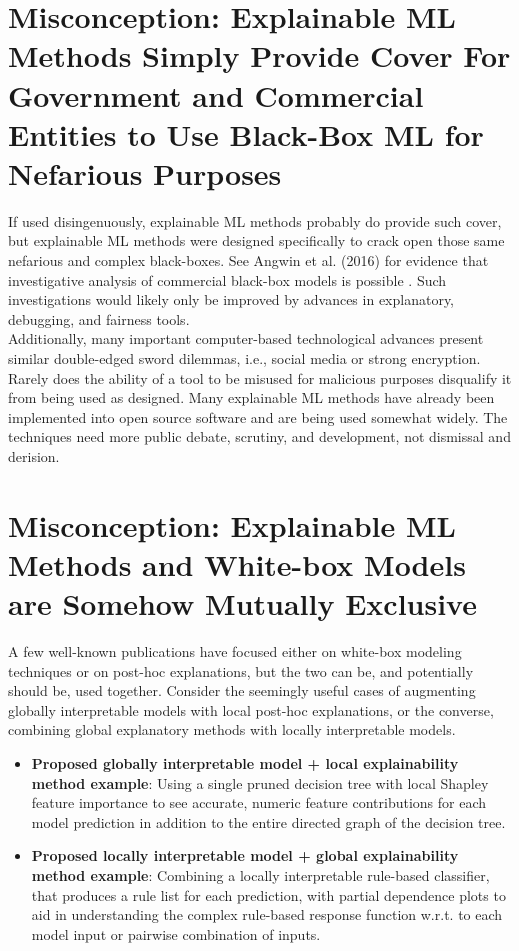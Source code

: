 \documentclass{article}
\begin{document}
\section{Misconception: Explainable ML Methods Simply Provide Cover For Government and Commercial Entities to Use Black-Box ML for Nefarious Purposes}

If used disingenuously, explainable ML methods probably do provide such cover, but explainable ML methods were designed specifically to crack open those same nefarious and complex black-boxes. See Angwin et al. (2016) for evidence that investigative analysis of commercial black-box models is possible \cite{angwin16}. Such investigations would likely only be improved by advances in explanatory, debugging, and fairness tools. \\

Additionally, many important computer-based technological advances present similar double-edged sword dilemmas, i.e., social media or strong encryption. Rarely does the ability of a tool to be misused for malicious purposes disqualify it from being used as designed. Many explainable ML methods have already been implemented into open source software and are being used somewhat widely. The techniques need more public debate, scrutiny, and development, not dismissal and derision.

\section{Misconception: Explainable ML Methods and White-box Models are Somehow Mutually Exclusive}

A few well-known publications have focused either on white-box modeling techniques or on post-hoc explanations, but the two can be, and potentially should be, used together. Consider the seemingly useful cases of augmenting globally interpretable models with local post-hoc explanations, or the converse, combining global explanatory methods with locally interpretable models.

\begin{itemize}
\item \textbf{Proposed globally interpretable model + local explainability method example}: Using a single pruned decision tree with local Shapley feature importance to see accurate, numeric feature contributions for each model prediction in addition to the entire directed graph of the decision tree.
\item \textbf{Proposed locally interpretable model + global explainability method example}: Combining a locally interpretable rule-based classifier, that produces a rule list for each prediction, with partial dependence plots to aid in understanding the complex rule-based response function w.r.t. to each model input or pairwise combination of inputs.  
\end{itemize}
\end{document}
